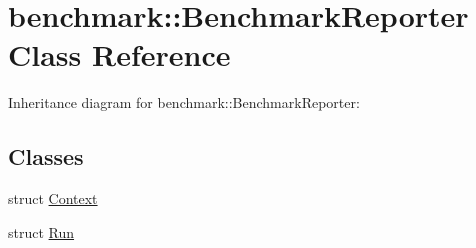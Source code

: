 \hypertarget{classbenchmark_1_1_benchmark_reporter}{}\section{benchmark\+:\+:Benchmark\+Reporter Class Reference}
\label{classbenchmark_1_1_benchmark_reporter}


Inheritance diagram for benchmark\+:\+:Benchmark\+Reporter\+:
\subsection*{Classes}
\begin{DoxyCompactItemize}
\item 
struct \mbox{\hyperlink{structbenchmark_1_1_benchmark_reporter_1_1_context}{Context}}
\item 
struct \mbox{\hyperlink{structbenchmark_1_1_benchmark_reporter_1_1_run}{Run}}
\end{DoxyCompactItemize}
